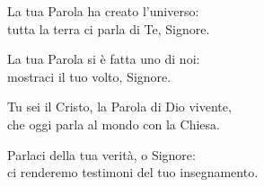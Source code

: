 

\spazio

\strofa La tua Parola ha creato l'universo:\\
tutta la terra ci parla di Te, Signore.

\spazio


\spazio

\strofa La tua Parola si è fatta uno di noi:\\
mostraci il tuo volto, Signore.

\spazio


\spazio

\strofa Tu sei il Cristo, la Parola di Dio vivente,\\
che oggi parla al mondo con la Chiesa.

\spazio


\spazio

\strofa Parlaci della tua verità, o Signore:\\
ci renderemo testimoni del tuo insegnamento.

\spazio

